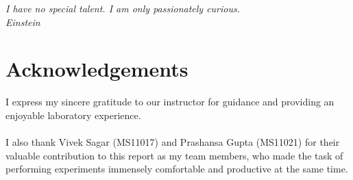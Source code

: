 
\begin{flushright}{\slshape    
I have no special talent. I am only passionately curious.\\
Einstein}
\end{flushright}



\bigskip

\begingroup
\let\clearpage\relax
\let\cleardoublepage\relax
\let\cleardoublepage\relax
\chapter*{Acknowledgements}
I express my sincere gratitude to our instructor \myProf for guidance and providing an enjoyable laboratory experience.\\
 \\
I also thank Vivek Sagar (MS11017) and Prashansa Gupta (MS11021) for their valuable contribution to this report as my team members, who made the task of performing experiments immensely comfortable and productive at the same time.\\
\bigskip


\endgroup



